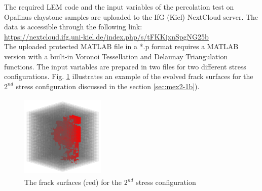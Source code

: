 The required LEM code and the input variables of the percolation test on Opalinus claystone samples are uploaded to the IfG (Kiel) NextCloud server. The data is accessible through the following link:\\
\hyperlink{https://nextcloud.ifg.uni-kiel.de/index.php/s/tFKKjxnSpgNG25b}{https://nextcloud.ifg.uni-kiel.de/index.php/s/tFKKjxnSpgNG25b}\\

The uploaded protected MATLAB file in a *.p format requires a MATLAB version with a built-in Voronoi Tessellation and Delaunay Triangulation functions. The input variables are prepared in two files for two different stress configurations. Fig. \ref{fig:Amir_ME2_B_Fracture_b_Data}
illustrates an example of the evolved frack surfaces for the $2^{nd}$ stress configuration discussed in the section  \ref{sec:mex2-1b}).

\begin{figure}[!ht]
\centering
\includegraphics[width=4cm,height=4cm]{figures/Amir_ME2_B_Fracture_b_Data.png}
\caption{The frack surfaces (red) for the $2^{nd}$ stress configuration}
\label{fig:Amir_ME2_B_Fracture_b_Data}
\end{figure}


